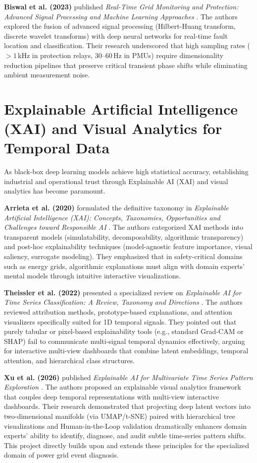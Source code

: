 \documentclass[12pt,a4paper]{report}
\begin{document}
\textbf{Biswal et al. (2023)} published \textit{Real-Time Grid Monitoring and Protection: Advanced Signal Processing and Machine Learning Approaches} \cite{ref_biswal2023_realtime}. The authors explored the fusion of advanced signal processing (Hilbert-Huang transform, discrete wavelet transforms) with deep neural networks for real-time fault location and classification. Their research underscored that high sampling rates ($>1$\,kHz in protection relays, $30\text{--}60$\,Hz in PMUs) require dimensionality reduction pipelines that preserve critical transient phase shifts while eliminating ambient measurement noise.

\section{Explainable Artificial Intelligence (XAI) and Visual Analytics for Temporal Data}
As black-box deep learning models achieve high statistical accuracy, establishing industrial and operational trust through Explainable AI (XAI) and visual analytics has become paramount.

\textbf{Arrieta et al. (2020)} formulated the definitive taxonomy in \textit{Explainable Artificial Intelligence (XAI): Concepts, Taxonomies, Opportunities and Challenges toward Responsible AI} \cite{ref_arrieta2020_xai}. The authors categorized XAI methods into transparent models (simulatability, decomposability, algorithmic transparency) and post-hoc explainability techniques (model-agnostic feature importance, visual saliency, surrogate modeling). They emphasized that in safety-critical domains such as energy grids, algorithmic explanations must align with domain experts' mental models through intuitive interactive visualizations.

\textbf{Theissler et al. (2022)} presented a specialized review on \textit{Explainable AI for Time Series Classification: A Review, Taxonomy and Directions} \cite{ref_theissler2022_xai}. The authors reviewed attribution methods, prototype-based explanations, and attention visualizers specifically suited for 1D temporal signals. They pointed out that purely tabular or pixel-based explainability tools (e.g., standard Grad-CAM or SHAP) fail to communicate multi-signal temporal dynamics effectively, arguing for interactive multi-view dashboards that combine latent embeddings, temporal attention, and hierarchical class structures.

\textbf{Xu et al. (2026)} published \textit{Explainable AI for Multivariate Time Series Pattern Exploration} \cite{ref_xu2026_xai}. The authors proposed an explainable visual analytics framework that couples deep temporal representations with multi-view interactive dashboards. Their research demonstrated that projecting deep latent vectors into two-dimensional manifolds (via UMAP/t-SNE) paired with hierarchical tree visualizations and Human-in-the-Loop validation dramatically enhances domain experts' ability to identify, diagnose, and audit subtle time-series pattern shifts. This project directly builds upon and extends these principles for the specialized domain of power grid event diagnosis.
\end{document}
